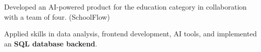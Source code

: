 \documentclass[letterpaper,10pt]{article}
\begin{document}
\begin{resume_list}
  \item Developed an AI-powered product for the education category in collaboration with a team of four. (SchoolFlow)
  \vspace{1pt}
  \item Applied skills in data analysis, frontend development, AI tools, and implemented an \textbf{SQL database backend}.
  \vspace{-2pt}
\end{resume_list}
\end{document}
